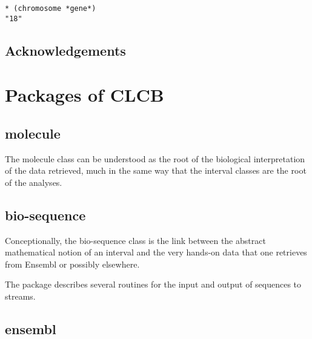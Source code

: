 \documentclass{book}
\newcommand\CLCB{CLCB }
\begin{document}
\begin{lstlisting}
* (chromosome *gene*)
"18"
\end{lstlisting}

\section{Acknowledgements}

\chapter{Packages of \CLCB}

\section{molecule}

The molecule class can be understood as the root of the biological interpretation of the data retrieved, much in the same way that the interval classes are the root of the analyses.

\begin{figure}
\begin{centering}

\end{centering}
\end{figure}

\section{bio-sequence}

Conceptionally, the bio-sequence class is the link between the abstract mathematical notion of an interval and the very hands-on data that one retrieves from Ensembl or possibly elsewhere.

\begin{figure}
\begin{centering}

\end{centering}
\end{figure}

The package describes several routines for the input and output of sequences to streams.

\section{ensembl}
\end{document}
